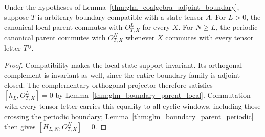 \begin{lemma}
    \label{thm:glm_dual_representation_parent}
    \leanok
    Under the hypotheses of Lemma~\ref{thm:glm_coalgebra_adjoint_boundary},
    suppose $T$ is arbitrary-boundary compatible with a state tensor $A$.
    For $L>0$, the canonical local parent commutes with $O^L_{T,X}$
    for every $X$. For $N\geq L$, the periodic canonical parent
    commutes with $O^N_{T,X}$ whenever $X$ commutes with every tensor
    letter $T^{ij}$.
\end{lemma}
\begin{proof}
    \leanok
    Compatibility makes the local state support invariant. Its
    orthogonal complement is invariant as well, since the entire boundary
    family is adjoint closed. The complementary orthogonal projector
    therefore satisfies $[h_L,O^L_{T,X}]=0$ by
    Lemma~\ref{thm:glm_boundary_parent_local}. Commutation
    with every tensor letter carries this equality to all
    cyclic windows, including those crossing the periodic boundary;
    Lemma~\ref{thm:glm_boundary_parent_periodic} then gives
    $[H_{L,N},O^N_{T,X}]=0$.
\end{proof}
